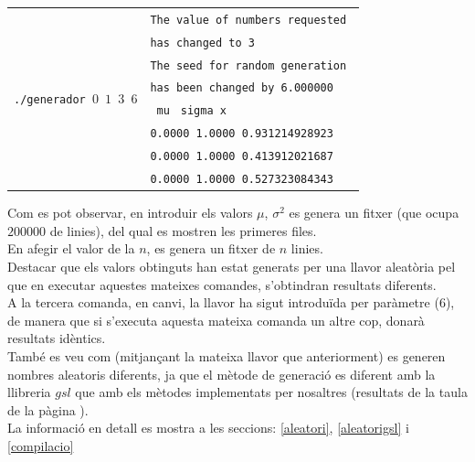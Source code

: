 \documentclass[a4paper, 11pt]{article}
\begin{document}
\begin{itemize}
\begin{table}[h]
\begin{center}
\begin{tabular}{ l | l }
            \multirow{8}{*}{\texttt{./generador  $0$  $1$ $3$ 
            $6$}} &\texttt{The value of numbers requested}\\
             & \texttt{has changed to 3} \\
             & \texttt{The seed for random generation }\\
             & \texttt{has been changed by 6.000000}\\
             &\hspace{1.5em}\texttt{    mu} \hspace{0.2em}\texttt{  sigma            }\hspace{5.9em}\texttt{x}\\ 
            & \texttt{0.0000 1.0000 0.931214928923}\\
            & \texttt{0.0000 1.0000 0.413912021687}\\
            & \texttt{0.0000 1.0000 0.527323084343}\\
            \end{tabular}
            \end{center}
    \end{table}
\end{itemize}
Com es pot observar, en introduir els valors $\mu$, $\sigma^2$ es genera un fitxer (que ocupa $200000$ de linies), del qual es mostren les primeres files.\\
En afegir el valor de la $n$, es genera un fitxer de $n$ linies.\\
Destacar que els valors obtinguts han estat generats per una llavor aleatòria pel que en executar aquestes mateixes comandes, s'obtindran resultats diferents.\\
A la tercera comanda, en canvi, la llavor ha sigut introduïda per paràmetre ($6$), de manera que si s'executa aquesta mateixa comanda un altre cop, donarà resultats idèntics.\\
També es veu com (mitjançant la mateixa llavor que anteriorment) es generen nombres aleatoris diferents, ja que el mètode de generació es diferent amb la llibreria $gsl$ que amb els mètodes implementats per nosaltres (resultats de la taula de la pàgina \textcolor{blue}{ \pageref{taula1}}). \\
La informació en detall es mostra a les seccions: \textcolor{blue}{\ref{aleatori}}, \textcolor{blue}{\ref{aleatorigsl}} i \textcolor{blue}{\ref{compilacio}}

\newpage
\end{document}
